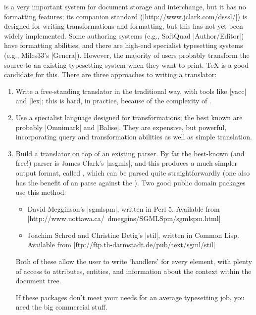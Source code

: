  is a very important system for document storage and interchange,
but it has no formatting features; its companion  standard
(\URL|http://www.jclark.com/dsssl/|) is designed for writing
transformations and formatting,
but this has not yet been widely implemented. Some  authoring
systems (e.g., SoftQuad \ProgName|Author/Editor|) have formatting
abilities, and
there are high-end specialist  typesetting systems (e.g., Miles33's
\ProgName|Genera|).  However, the majority of  users probably transform
the source to an existing typesetting system when they want to print. 
\TeX{} is a good candidate for this. There are three approaches to writing a
translator:
\begin{enumerate}
\item Write a free-standing translator in the traditional way, with
  tools like \ProgName|yacc| and \ProgName|lex|; this is hard, in
  practice, because of the complexity of .
\item Use a specialist language designed for  transformations; the
  best known are probably \ProgName|Omnimark| and \ProgName|Balise|.
  They are expensive, but powerful, incorporating  query and
  transformation abilities as well as simple translation.
\item Build a translator on top of an existing  parser.  By far
  the best-known (and free!) parser is James Clark's
  \ProgName|nsgmls|, and this produces a much simpler output format,
  called , which can be parsed quite straightforwardly (one also
  has the benefit of an  parse against the ). Two
  good public domain packages use this method:
  \begin{itemize}
    \item David Megginson's \ProgName|sgmlspm|, written in Perl 5.
      Available from
      \URL|http://www.uottawa.ca/~dmeggins/SGMLSpm/sgmlspm.html|
    \item Joachim Schrod and Christine Detig's \ProgName|stil|, written in
      Common Lisp. Available from
      \URL|ftp://ftp.th-darmstadt.de/pub/text/sgml/stil|
  \end{itemize}
  Both of these allow the user to write `handlers' for every 
  element, with plenty of access to attributes, entities, and
  information about the context within the document tree.

  If these packages don't meet your needs for an average 
  typesetting job, you need the big commercial stuff.
\end{enumerate}

